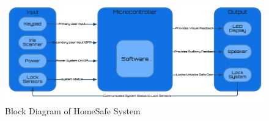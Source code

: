 \documentclass{article}
\begin{document}
\newpage

\begin{figure}[h]
    \centering
    \includegraphics[scale=0.32]{docs/figs/system_diagram.png}
    \caption{Block Diagram of HomeSafe System \cite{lucidLucidVisual}}
    \label{fig:diagram1}
\end{figure}
\end{document}
